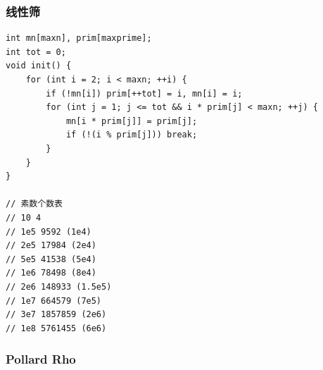 \documentclass[twoside]{article}
\begin{document}
\subsubsection{线性筛}
\begin{lstlisting}
int mn[maxn], prim[maxprime];
int tot = 0;
void init() {
    for (int i = 2; i < maxn; ++i) {
        if (!mn[i]) prim[++tot] = i, mn[i] = i;
        for (int j = 1; j <= tot && i * prim[j] < maxn; ++j) {
            mn[i * prim[j]] = prim[j];
            if (!(i % prim[j])) break;
        }
    }
}

// 素数个数表
// 10 4
// 1e5 9592 (1e4)
// 2e5 17984 (2e4)
// 5e5 41538 (5e4)
// 1e6 78498 (8e4)
// 2e6 148933 (1.5e5)
// 1e7 664579 (7e5)
// 3e7 1857859 (2e6)
// 1e8 5761455 (6e6)\end{lstlisting}
\subsubsection{Pollard Rho}
\end{document}
